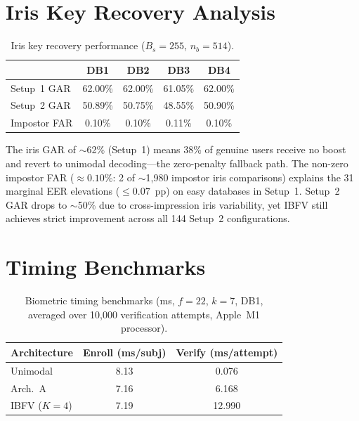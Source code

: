 \section{Iris Key Recovery Analysis}
\label{sec:iris_gar}

\begin{table}[h]
\centering
\caption{Iris key recovery performance ($B_s = 255$, $n_b = 514$).}
\label{tab:iris_gar}
\small
\begin{tabular}{@{}l cccc@{}}
\toprule
 & \textbf{DB1} & \textbf{DB2} & \textbf{DB3} & \textbf{DB4} \\
\midrule
Setup~1 GAR   & 62.00\% & 62.00\% & 61.05\% & 62.00\% \\
Setup~2 GAR   & 50.89\% & 50.75\% & 48.55\% & 50.90\% \\
Impostor FAR  & 0.10\%  & 0.10\%  & 0.11\%  & 0.10\%  \\
\bottomrule
\end{tabular}
\end{table}

The iris GAR of $\sim$62\% (Setup~1) means 38\% of genuine users receive no boost
and revert to unimodal decoding---the zero-penalty fallback path. The non-zero
impostor FAR ($\approx 0.10\%$: 2 of $\sim$1,980 impostor iris comparisons) explains
the 31 marginal EER elevations ($\leq 0.07$~pp) on easy databases in Setup~1.
Setup~2 GAR drops to $\sim$50\% due to cross-impression iris variability, yet IBFV
still achieves strict improvement across all 144 Setup~2 configurations.

\section{Timing Benchmarks}
\label{sec:timing_results}

\begin{table}[h]
\centering
\caption{Biometric timing benchmarks (ms, $f=22$, $k=7$, DB1, averaged over
10{,}000 verification attempts, Apple~M1 processor).}
\label{tab:timing}
\small
\begin{tabular}{@{}lcc@{}}
\toprule
\textbf{Architecture} & \textbf{Enroll (ms/subj)} & \textbf{Verify (ms/attempt)} \\
\midrule
Unimodal     & 8.13  & 0.076  \\
Arch.~A      & 7.16  & 6.168  \\
IBFV ($K=4$) & 7.19  & 12.990 \\
\bottomrule
\end{tabular}
\end{table}

